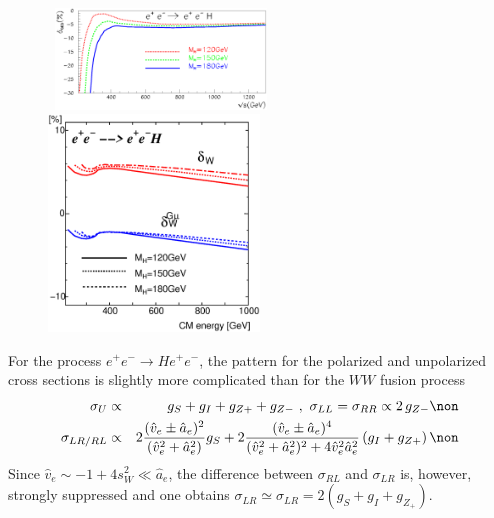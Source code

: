 {\begin{figure}[!h]
\vspace*{-2mm}
\begin{center}
\mbox{
\includegraphics[width=0.5\textwidth,height=8.cm]{./sm4/ee-Hee-cr1.eps}
\includegraphics[width=0.5\textwidth,height=8.cm]{./sm4/ee-Hee-cr2.eps} }
\end{center}
\vspace*{-4mm}
\vspace*{-2mm}
\end{figure}

For the process $e^+e^-\to He^+e^-$, the pattern for the polarized and 
unpolarized cross sections is slightly more complicated than for the $WW$ 
fusion process \cite{ZZH-Kilian}
\begin{eqnarray}
  \sigma_U &\propto&
	g_S + g_I + g_{Z+} + g_{Z-}\ , \  \sigma_{LL} = \sigma_{RR} \propto
	2\,g_{Z-} \non \\
  \sigma_{LR/RL} &\propto&
	2\frac{(\hat v_e\pm \hat a_e)^2}{(\hat v_e^2+\hat a_e^2)}g_S
	+ 2\frac{(\hat v_e\pm\hat a_e)^4}{(\hat v_e^2+\hat a_e^2)^2+4\hat 
        v_e^2 \hat a_e^2}
	\left(g_I + g_{Z+}\right) \non 
\end{eqnarray}
Since $\hat v_e \sim -1+4s_W^2 \ll \hat a_e$, the difference between 
$\sigma_{RL}$ and $\sigma_{LR}$ is, however, strongly suppressed and one 
obtains $\sigma_{LR} \simeq \sigma_{LR}= 2 (g_S+ g_I+ g_{Z_+})$.\s
 
}
